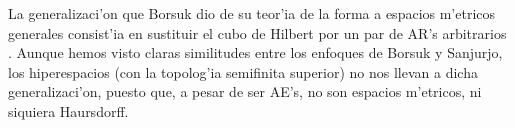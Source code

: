 La generalizaci'on que Borsuk dio de su teor'ia de la forma a espacios m'etricos generales consist'ia en sustituir el cubo de Hilbert por un par de AR's arbitrarios \cite{borsuk1975}. Aunque hemos visto claras similitudes entre los enfoques de Borsuk y Sanjurjo, los hiperespacios (con la topolog'ia semifinita superior) no nos llevan a dicha generalizaci'on, puesto que, a pesar de ser AE's, no son espacios m'etricos, ni siquiera Haursdorff. 